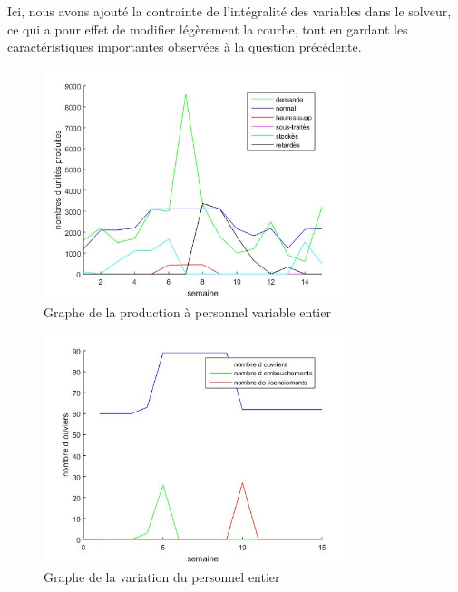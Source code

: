 Ici, nous avons ajouté la contrainte de l'intégralité des variables dans le solveur, ce qui a pour effet de modifier légèrement la courbe, tout en gardant les caractéristiques importantes observées à la question précédente.

\begin{figure}[H]
    \centering
    \includegraphics[width=0.8\textwidth]{graphes/graphq9.jpg}
    \caption{Graphe de la production à personnel variable entier}
    \label{fig:q8_01}
\end{figure}

\begin{figure}[H]
    \centering
    \includegraphics[width=0.8\textwidth]{graphes/ouvrierq9.jpg}
    \caption{Graphe de la variation du personnel entier}
    \label{fig:q8_02}
\end{figure}
